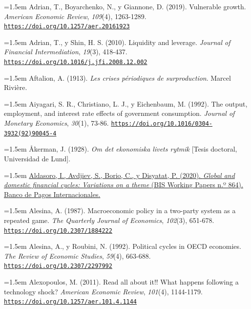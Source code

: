 \documentclass[10pt,a4paper]{article}
\begin{document}
\noindent\hangindent=1.5em Adrian, T., Boyarchenko, N., y Giannone, D. (2019). Vulnerable growth. \textit{American Economic Review}, \textit{109}(4), 1263-1289. \href{https://doi.org/10.1257/aer.20161923}{\nolinkurl{https://doi.org/10.1257/aer.20161923}}

\noindent\hangindent=1.5em Adrian, T., y Shin, H. S. (2010). Liquidity and leverage. \textit{Journal of Financial Intermediation}, \textit{19}(3), 418-437. \href{https://doi.org/10.1016/j.jfi.2008.12.002}{\nolinkurl{https://doi.org/10.1016/j.jfi.2008.12.002}}

\noindent\hangindent=1.5em Aftalion, A. (1913). \textit{Les crises périodiques de surproduction}. Marcel Rivière.

\noindent\hangindent=1.5em Aiyagari, S. R., Christiano, L. J., y Eichenbaum, M. (1992). The output, employment, and interest rate effects of government consumption. \textit{Journal of Monetary Economics}, \textit{30}(1), 73-86. \href{https://doi.org/10.1016/0304-3932(92)90045-4}{\nolinkurl{https://doi.org/10.1016/0304-3932(92)90045-4}}

\noindent\hangindent=1.5em Åkerman, J. (1928). \textit{Om det ekonomiska livets rytmik} [Tesis doctoral, Universidad de Lund].

\noindent\hangindent=1.5em \href{https://www.bis.org/publ/work864.htm}{Aldasoro, I., Avdjiev, S., Borio, C., y Disyatat, P. (2020). \textit{Global and domestic financial cycles: Variations on a theme} (BIS Working Papers n.º 864). Banco de Pagos Internacionales.}

\noindent\hangindent=1.5em Alesina, A. (1987). Macroeconomic policy in a two-party system as a repeated game. \textit{The Quarterly Journal of Economics}, \textit{102}(3), 651-678. \href{https://doi.org/10.2307/1884222}{\nolinkurl{https://doi.org/10.2307/1884222}}

\noindent\hangindent=1.5em Alesina, A., y Roubini, N. (1992). Political cycles in OECD economies. \textit{The Review of Economic Studies}, \textit{59}(4), 663-688. \href{https://doi.org/10.2307/2297992}{\nolinkurl{https://doi.org/10.2307/2297992}}

\noindent\hangindent=1.5em Alexopoulos, M. (2011). Read all about it!! What happens following a technology shock? \textit{American Economic Review}, \textit{101}(4), 1144-1179. \href{https://doi.org/10.1257/aer.101.4.1144}{\nolinkurl{https://doi.org/10.1257/aer.101.4.1144}}
\end{document}
